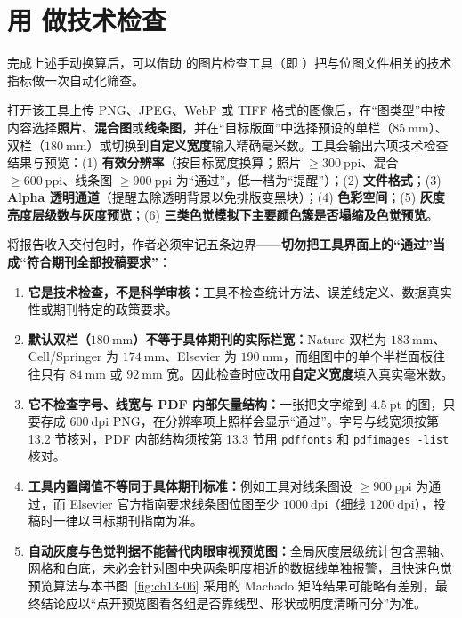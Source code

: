 \section{用  做技术检查}

完成上述手动换算后，可以借助 \scidraw{} 的图片检查工具（即 ）把与位图文件相关的技术指标做一次自动化筛查。

打开该工具上传 PNG、JPEG、WebP 或 TIFF 格式的图像后，在“图类型”中按内容选择\textbf{照片}、\textbf{混合图}或\textbf{线条图}，并在“目标版面”中选择预设的单栏（$85\ \text{mm}$）、双栏（$180\ \text{mm}$）或切换到\textbf{自定义宽度}输入精确毫米数。工具会输出六项技术检查结果与预览：(1) \textbf{有效分辨率}（按目标宽度换算；照片 $\ge 300\ \text{ppi}$、混合 $\ge 600\ \text{ppi}$、线条图 $\ge 900\ \text{ppi}$ 为“通过”，低一档为“提醒”）；(2) \textbf{文件格式}；(3) \textbf{Alpha 透明通道}（提醒去除透明背景以免排版变黑块）；(4) \textbf{色彩空间}；(5) \textbf{灰度亮度层级数与灰度预览}；(6) \textbf{三类色觉模拟下主要颜色簇是否塌缩及色觉预览}。

将报告收入交付包时，作者必须牢记五条边界——\textbf{切勿把工具界面上的“通过”当成“符合期刊全部投稿要求”}：
\begin{enumerate}
\item \textbf{它是技术检查，不是科学审核：}工具不检查统计方法、误差线定义、数据真实性或期刊特定的政策要求。
\item \textbf{默认双栏（$180\ \text{mm}$）不等于具体期刊的实际栏宽：}Nature 双栏为 $183\ \text{mm}$、Cell/Springer 为 $174\ \text{mm}$、Elsevier 为 $190\ \text{mm}$，而组图中的单个半栏面板往往只有 $84\ \text{mm}$ 或 $92\ \text{mm}$ 宽。因此检查时应改用\textbf{自定义宽度}填入真实毫米数。
\item \textbf{它不检查字号、线宽与 PDF 内部矢量结构：}一张把文字缩到 $4.5\ \text{pt}$ 的图，只要存成 $600\ \text{dpi}$ PNG，在分辨率项上照样会显示“通过”。字号与线宽须按第 13.2 节核对，PDF 内部结构须按第 13.3 节用 \texttt{pdffonts} 和 \texttt{pdfimages -list} 核对。
\item \textbf{工具内置阈值不等同于具体期刊标准：}例如工具对线条图设 $\ge 900\ \text{ppi}$ 为通过，而 Elsevier 官方指南要求线条图位图至少 $1000\ \text{dpi}$（细线 $1200\ \text{dpi}$），投稿时一律以目标期刊指南为准。
\item \textbf{自动灰度与色觉判据不能替代肉眼审视预览图：}全局灰度层级统计包含黑轴、网格和白底，未必会针对图中央两条明度相近的数据线单独报警，且快速色觉预览算法与本书图~\ref{fig:ch13-06} 采用的 Machado 矩阵结果可能略有差别，最终结论应以“点开预览图看各组是否靠线型、形状或明度清晰可分”为准。
\end{enumerate}

